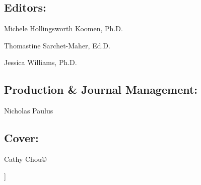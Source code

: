 \documentclass{sig-alternate} %
\begin{document}
\begin{large}
\begin{@twocolumnfalse}
\subsection*{Editors:}
Michele Hollingsworth Koomen, Ph.D.

Thomastine Sarchet-Maher, Ed.D.

Jessica Williams, Ph.D.

\subsection*{Production \& Journal Management:}
Nicholas Paulus

\subsection*{Cover:}
Cathy Chou©
\end{@twocolumnfalse}]

\end{large}
\end{document}
